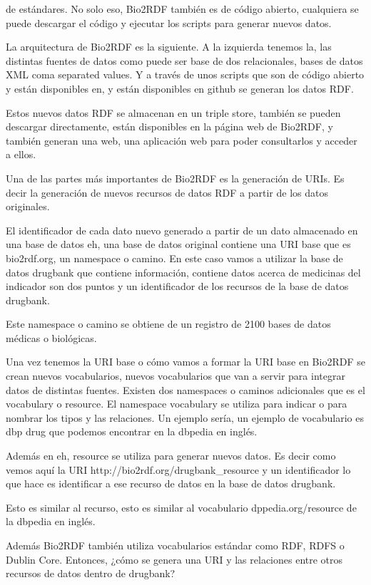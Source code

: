de estándares. No solo eso, Bio2RDF también es de código abierto, cualquiera se puede descargar el código y ejecutar los scripts para generar nuevos datos.

La arquitectura de Bio2RDF es la siguiente. A la izquierda tenemos la, las distintas fuentes de datos como puede ser base de dos relacionales, bases de datos XML coma separated values. Y a través de unos scripts que son de código abierto y están disponibles en, y están disponibles en github se generan los datos RDF.

Estos nuevos datos RDF se almacenan en un triple store, también se pueden descargar directamente, están disponibles en la página web de Bio2RDF, y también generan una web, una aplicación web para poder consultarlos y acceder a ellos.

Una de las partes más importantes de Bio2RDF es la generación de URIs. Es decir la generación de nuevos recursos de datos RDF a partir de los datos originales.

El identificador de cada dato nuevo generado a partir de un dato almacenado en una base de datos eh, una base de datos original contiene una URI base que es bio2rdf.org, un namespace o camino. En este caso vamos a utilizar la base de datos drugbank que contiene información, contiene datos acerca de medicinas del indicador son dos puntos y un identificador de los recursos de la base de datos drugbank.

Este namespace o camino se obtiene de un registro de 2100 bases de datos médicas o biológicas.

Una vez tenemos la URI base o cómo vamos a formar la URI base en Bio2RDF se crean nuevos vocabularios, nuevos vocabularios que van a servir para integrar datos de distintas fuentes. Existen dos namespaces o caminos adicionales que es el vocabulary o resource. El namespace vocabulary se utiliza para indicar o para nombrar los tipos y las relaciones. Un ejemplo sería, un ejemplo de vocabulario es dbp drug que podemos encontrar en la dbpedia en inglés.

Además en eh, resource se utiliza para generar nuevos datos. Es decir como vemos aquí la URI http://bio2rdf.org/drugbank_resource y un identificador lo que hace es identificar a ese recurso de datos en la base de datos drugbank.

Esto es similar al recurso, esto es similar al vocabulario dppedia.org/resource de la dbpedia en inglés.

Además Bio2RDF también utiliza vocabularios estándar como RDF, RDFS o Dublin Core. Entonces, ¿cómo se genera una URI y las relaciones entre otros recursos de datos dentro de drugbank?

